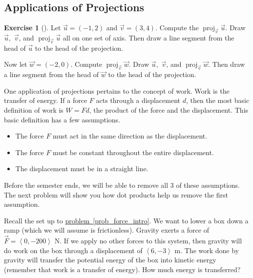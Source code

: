 \documentclass[10pt,]{book}
\theoremstyle{plain}
\theoremstyle{definition}
\theoremstyle{definition}
\theoremstyle{definition}
\theoremstyle{definition}
\newtheorem{exploration}[project]{Exercise}
\theoremstyle{definition}
\numberwithin{equation}{section}
\DeclareMathOperator{\proj}{proj}
\newcommand{\lt}{<}
\begin{document}
\subsection[{Applications of Projections}]{Applications of Projections}\label{subsection-14}
\begin{exploration}[]\label{exploration-51}
Let \(\vec u=(-1,2)\) and \(\vec v=(3,4)\). Compute the \(\proj_{\vec v}\vec u\). Draw \(\vec u,\) \(\vec v\), and \(\proj_{\vec v}\vec u\) all on one set of axis. Then draw a line segment from the head of \(\vec u\) to the head of the projection.%
\par
Now let \(\vec w=(-2,0)\). Compute \(\proj_{\vec v}\vec w\). Draw \(\vec u,\) \(\vec v\), and \(\proj_{\vec v}\vec w\). Then draw a line segment from the head of \(\vec w\) to the head of the projection.%
\end{exploration}
One application of projections pertains to the concept of work. Work is the transfer of energy. If a force \(F\) acts through a displacement \(d\), then the most basic definition of work is \(W=Fd\), the product of the force and the displacement. This basic definition has a few assumptions. \leavevmode%
\begin{itemize}[label=\textbullet]
\item{}The force \(F\) must act in the same direction as the displacement.%
\item{}The force \(F\) must be constant throughout the entire displacement.%
\item{}The displacement must be in a straight line.%
\end{itemize}
%
\par
Before the semester ends, we will be able to remove all 3 of these assumptions. The next problem will show you how dot products help us remove the first assumption.%
\par
Recall the set up to \hyperref[prob_force_intro]{problem~\ref{prob_force_intro}}. We want to lower a box down a ramp (which we will assume is frictionless). Gravity exerts a force of \(\vec F=\left\lt 0,-200\right>\) N. If we apply no other forces to this system, then gravity will do work on the box through a displacement of \(\left\lt 6,-3\right>\) m. The work done by gravity will transfer the potential energy of the box into kinetic energy (remember that work is a transfer of energy). How much energy is transferred?%
\end{document}
